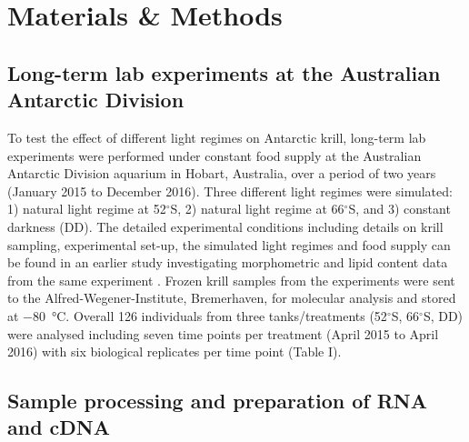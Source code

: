 \section{Materials \& Methods}
\subsection{Long-term lab experiments at the Australian Antarctic Division}

To test the effect of different light regimes on Antarctic krill, long-term lab
experiments were performed under constant food supply at the Australian
Antarctic Division aquarium in Hobart, Australia, over a period of two years
(January 2015 to December 2016). Three different light regimes were simulated:
1) natural light regime at 52$^{\circ}$S, 2) natural light regime at
66$^{\circ}$S, and 3) constant darkness (DD). The detailed experimental
conditions including details on krill sampling, experimental set-up, the
simulated light regimes and food supply can be found in an earlier study
investigating morphometric and lipid content data from the same experiment
\citep{horing_light_2018}. Frozen krill samples from the experiments were sent
to the Alfred-Wegener-Institute, Bremerhaven, for molecular analysis and stored
at \SI{-80}{\celsius}. Overall 126 individuals from three tanks/treatments
(52$^{\circ}$S, 66$^{\circ}$S, DD) were analysed including seven time points
per treatment (April 2015 to April 2016) with six biological replicates per
time point (Table I). 


\subsection{Sample processing and preparation of RNA and cDNA}

